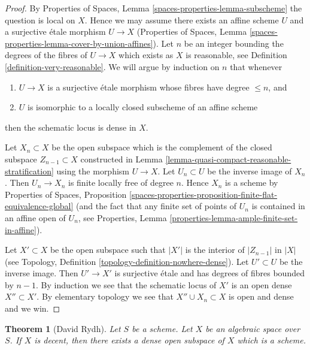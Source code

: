 \documentclass{stacks-project}
\theoremstyle{plain}
\newtheorem{theorem}[subsection]{Theorem}
\theoremstyle{definition}
\theoremstyle{remark}
\numberwithin{equation}{subsection}
\begin{document}
\begin{proof}
By Properties of Spaces,
Lemma \ref{spaces-properties-lemma-subscheme}
the question is local on $X$. Hence we may assume there exists an affine
scheme $U$ and a surjective \'etale morphism $U \to X$
(Properties of Spaces, Lemma
\ref{spaces-properties-lemma-cover-by-union-affines}).
Let $n$ be an integer bounding the degrees of the fibres of $U \to X$
which exists as $X$ is reasonable, see
Definition \ref{definition-very-reasonable}.
We will argue by induction on $n$ that whenever
\begin{enumerate}
\item $U \to X$ is a surjective \'etale morphism whose fibres have
degree $\leq n$, and
\item $U$ is isomorphic to a locally closed subscheme of an affine scheme
\end{enumerate}
then the schematic locus is dense in $X$.

\medskip\noindent
Let $X_n \subset X$ be the open subspace which is the complement of the
closed subspace $Z_{n - 1} \subset X$ constructed in
Lemma \ref{lemma-quasi-compact-reasonable-stratification}
using the morphism $U \to X$.
Let $U_n \subset U$ be the inverse image of $X_n$. Then
$U_n \to X_n$ is finite locally free of degree $n$.
Hence $X_n$ is a scheme by
Properties of Spaces, Proposition
\ref{spaces-properties-proposition-finite-flat-equivalence-global}
(and the fact that any finite set of points of $U_n$ is contained in
an affine open of $U_n$, see
Properties, Lemma \ref{properties-lemma-ample-finite-set-in-affine}).

\medskip\noindent
Let $X' \subset X$ be the open subspace such that $|X'|$ is the
interior of $|Z_{n - 1}|$ in $|X|$ (see
Topology, Definition \ref{topology-definition-nowhere-dense}).
Let $U' \subset U$ be the inverse image. Then $U' \to X'$ is surjective
\'etale and has degrees of fibres bounded by $n - 1$. By induction
we see that the schematic locus of $X'$ is an open dense $X'' \subset X'$.
By elementary topology we see that $X'' \cup X_n \subset X$ is
open and dense and we win.
\end{proof}

\begin{theorem}[David Rydh]
\label{theorem-decent-open-dense-scheme}
Let $S$ be a scheme. Let $X$ be an algebraic space over $S$.
If $X$ is decent, then there exists a dense open subspace
of $X$ which is a scheme.
\end{theorem}
\end{document}
